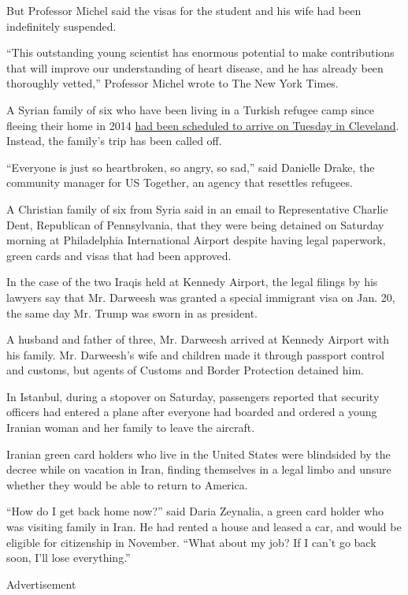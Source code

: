 But Professor Michel said the visas for the student and his wife had
been indefinitely suspended.

``This outstanding young scientist has enormous potential to make
contributions that will improve our understanding of heart disease, and
he has already been thoroughly vetted,'' Professor Michel wrote to The
New York Times.

A Syrian family of six who have been living in a Turkish refugee camp
since fleeing their home in 2014
\href{http://www.cleveland.com/metro/index.ssf/2017/01/president_donal_trump_acts_to.html}{had
been scheduled to arrive on Tuesday in Cleveland}. Instead, the family's
trip has been called off.

``Everyone is just so heartbroken, so angry, so sad,'' said Danielle
Drake, the community manager for US Together, an agency that resettles
refugees.

A Christian family of six from Syria said in an email to Representative
Charlie Dent, Republican of Pennsylvania, that they were being detained
on Saturday morning at Philadelphia International Airport despite having
legal paperwork, green cards and visas that had been approved.

In the case of the two Iraqis held at Kennedy Airport, the legal filings
by his lawyers say that Mr. Darweesh was granted a special immigrant
visa on Jan. 20, the same day Mr. Trump was sworn in as president.

A husband and father of three, Mr. Darweesh arrived at Kennedy Airport
with his family. Mr. Darweesh's wife and children made it through
passport control and customs, but agents of Customs and Border
Protection detained him.

In Istanbul, during a stopover on Saturday, passengers reported that
security officers had entered a plane after everyone had boarded and
ordered a young Iranian woman and her family to leave the aircraft.

Iranian green card holders who live in the United States were blindsided
by the decree while on vacation in Iran, finding themselves in a legal
limbo and unsure whether they would be able to return to America.

``How do I get back home now?'' said Daria Zeynalia, a green card holder
who was visiting family in Iran. He had rented a house and leased a car,
and would be eligible for citizenship in November. ``What about my job?
If I can't go back soon, I'll lose everything.''

Advertisement

